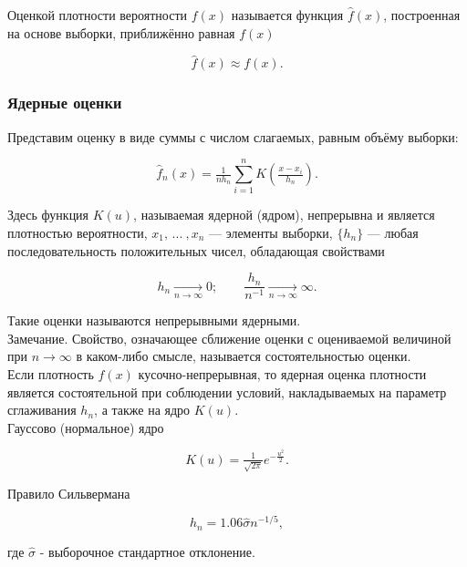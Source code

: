 Оценкой плотности вероятности $f(x)$ называется функция $\widehat{f}(x)$, построенная на основе выборки, приближённо равная $f(x)$

\begin{equation}
	\widehat{f}(x) \approx f(x).
\end{equation}

\subsubsection{Ядерные оценки}

Представим оценку в виде суммы с числом слагаемых, равным объёму выборки:

\begin{equation}
	\widehat{f}_n(x) = \tfrac{1}{nh_n}\sum\limits_{i=1}^n K\left( \tfrac{x - x_i}{h_n} \right).
\end{equation}

Здесь функция $K(u)$, называемая ядерной (ядром), непрерывна и является плотностью вероятности, $x_1, \, ... \: , x_n$ --- элементы выборки, $\{h_n\}$ --- любая последовательность положительных чисел, обладающая свойствами

\begin{equation}
	h_n \underset{n \to \infty}{\longrightarrow} 0; \qquad \dfrac{h_n}{n^{-1}} \underset{n \to \infty}{\longrightarrow} \infty.
\end{equation}

Такие оценки называются непрерывными ядерными.\\

Замечание. Свойство, означающее сближение оценки с оцениваемой величиной при $n \rightarrow \infty$ в каком-либо смысле, называется состоятельностью оценки.\\

Если плотность $f(x)$ кусочно-непрерывная, то ядерная оценка плотности является состоятельной при соблюдении условий, накладываемых на параметр сглаживания $h_n$, а также на ядро $K(u)$.\\

Гауссово (нормальное) ядро \cite[с. 38]{a:nonParamRegr}

\begin{equation}
	K(u) = \tfrac{1}{\sqrt{2\pi}}e^{-\tfrac{u^2}{2}}.
\end{equation}

Правило Сильвермана \cite[с. 44]{a:nonParamRegr}

\begin{equation}
	h_n = 1.06\hat{\sigma}n^{-1/5},
\end{equation}

где $\hat{\sigma}$ - выборочное стандартное отклонение.

\newpage
